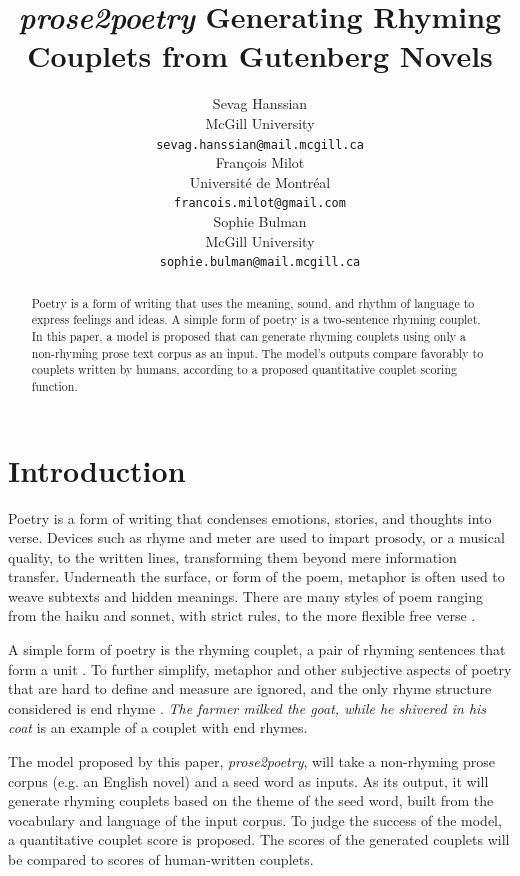 \documentclass[11pt,a4paper]{article}
\title{\textit{prose2poetry} Generating Rhyming Couplets from Gutenberg Novels}
\author{Sevag Hanssian \\
  McGill University \\
 \texttt{sevag.hanssian@mail.mcgill.ca}\\\And
  François Milot \\
  Université de Montréal \\
  \texttt{francois.milot@gmail.com}\\\AND Sophie Bulman \\
  McGill University \\
   \texttt{sophie.bulman@mail.mcgill.ca}}
\date{}
\begin{document}
\maketitle
\begin{abstract}
	Poetry is a form of writing that uses the meaning, sound, and rhythm of language to express feelings and ideas. A simple form of poetry is a two-sentence rhyming couplet. In this paper, a model is proposed that can generate rhyming couplets using only a non-rhyming prose text corpus as an input. The model's outputs compare favorably to couplets written by humans, according to a proposed quantitative couplet scoring function.
\end{abstract}

\section{Introduction}
\label{sec:intro}

Poetry is a form of writing that condenses emotions, stories, and thoughts into verse. Devices such as rhyme and meter are used to impart prosody, or a musical quality, to the written lines, transforming them beyond mere information transfer. Underneath the surface, or form of the poem, metaphor is often used to weave subtexts and hidden meanings. There are many styles of poem ranging from the haiku and sonnet, with strict rules, to the more flexible free verse \citep{poem_type}.

A simple form of poetry is the rhyming couplet, a pair of rhyming sentences that form a unit \cite{couplet_def}. To further simplify, metaphor and other subjective aspects of poetry that are hard to define and measure are ignored, and the only rhyme structure considered is end rhyme \cite{end_rhyme_def}. \textit{The farmer milked the goat, while he shivered in his coat} is an example of a couplet with end rhymes.

The model proposed by this paper, \textit{prose2poetry}, will take a non-rhyming prose corpus (e.g. an English novel) and a seed word as inputs. As its output, it will generate rhyming couplets based on the theme of the seed word, built from the vocabulary and language of the input corpus. To judge the success of the model, a quantitative couplet score is proposed. The scores of the generated couplets will be compared to scores of human-written couplets.

\end{document}
